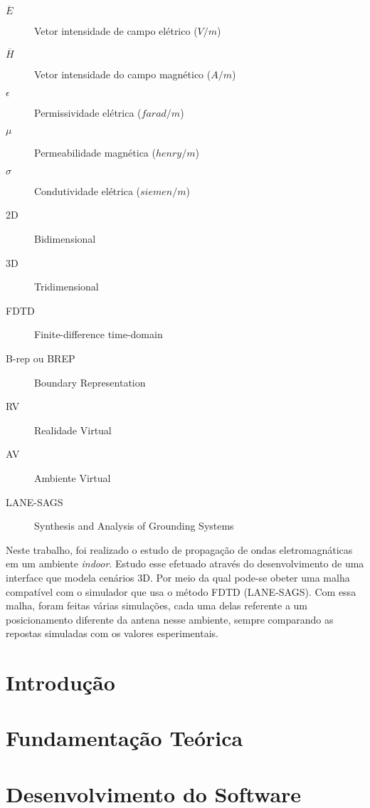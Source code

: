 \documentclass{./public/ufpatcc}
\begin{document}
\begin{description}
	\item[$\overline{E}$]	Vetor intensidade de campo elétrico ($V/m$)
	\item[$\overline{H}$]	Vetor intensidade do campo magnético ($A/m$)
	\item[$\epsilon$]	Permissividade elétrica ($farad/m$)
	\item[$\mu$]	Permeabilidade magnética ($henry/m$)
	\item[$\sigma$]	Condutividade elétrica ($siemen/m$)
	\item[2D]	Bidimensional 
	\item[3D]	Tridimensional 
	\item[FDTD]	Finite-difference time-domain 
	\item[B-rep ou BREP]	Boundary Representation 
	\item[RV]	Realidade Virtual 
	\item[AV]	Ambiente Virtual 
	\item[LANE-SAGS]	Synthesis and Analysis of Grounding Systems 
\end{description}

\clearpage

\begin{ufpaResumo}
Neste trabalho, foi realizado o estudo de propagação de ondas eletromagnáticas em um ambiente \textit{indoor}. Estudo esse efetuado através do desenvolvimento de uma interface que modela cenários 3D. Por meio da qual pode-se obeter uma malha compatível com o simulador que usa o método FDTD (LANE-SAGS). Com essa malha, foram feitas várias simulações, cada uma delas referente a um posicionamento diferente da antena nesse ambiente, sempre comparando as repostas simuladas com os valores esperimentais.
\end{ufpaResumo}


\chapter{Introdução}


\chapter{Fundamentação Teórica}


\chapter{Desenvolvimento do Software}

\end{document}
